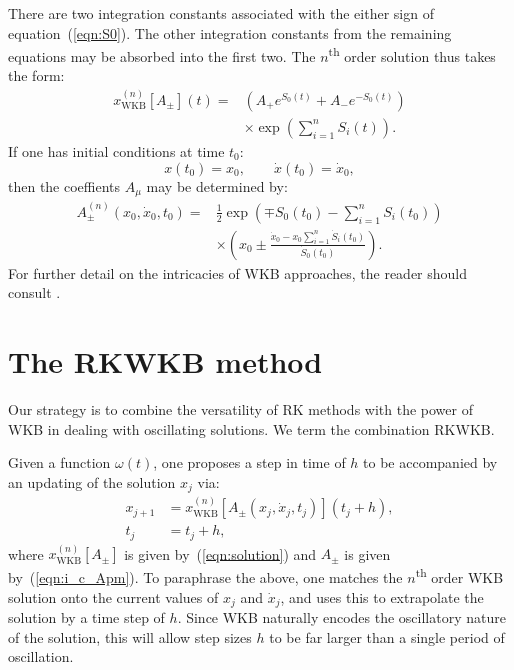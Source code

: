 There are two integration constants associated with the either sign of equation~(\ref{eqn:S0}). The other integration constants from the remaining equations may be absorbed into the first two. The $n$\textsuperscript{th} order solution thus takes the form:
\begin{align}
  x_\mathrm{WKB}^{(n)}[A_{\pm}](t) =&
  \left( A_{+} e^{S_0(t)} + A_{-} e^{-S_0(t)} \right)
  \nonumber\\
  &\times \exp\left( \sum_{i=1}^n S_i(t) \right).
  \label{eqn:solution}
\end{align}
If one has initial conditions at time $t_0$:
\begin{equation}
  x(t_0) = x_0, \qquad \dot{x}(t_0)=\dot{x}_0,
  \label{eqn:i_c}
\end{equation}
then the coeffients $A_\mu$ may be determined by:
\begin{align}
  A_\pm^{(n)}(x_0,\dot{x}_0,t_0) =& \frac{1}{2}\exp{\left( \mp S_0(t_0) - \sum_{i=1}^n S_i(t_0) \right)}
  \nonumber\\
  &\times\left( x_0 \pm  \frac{\dot{x}_0-x_0\sum_{i=1}^n \dot{S}_i(t_0)}{\dot{S}_0(t_0)}\right).
  \label{eqn:i_c_Apm}
\end{align}
For further detail on the intricacies of WKB approaches, the reader should consult \cite{RHB,Bender+2010}.

\section{The RKWKB method}
Our strategy is to combine the versatility of RK methods with the power of WKB in dealing with oscillating solutions. We term the combination RKWKB.

Given a function $\omega(t)$, one proposes a step in time of $h$ to be accompanied by an updating of the solution $x_j$ via:
\begin{align}
  x_{j+1} &= x_\mathrm{WKB}^{(n)}[A_\pm(x_j,\dot{x}_j,t_j)](t_j+h),
  \label{eqn:WKB_x_step} \\
  t_j &= t_j+h,
  \label{eqn:WKB_t_step}
\end{align}
where $x_\mathrm{WKB}^{(n)}[A_{\pm}]$ is given by~(\ref{eqn:solution}) and $A_{\pm}$ is given by~(\ref{eqn:i_c_Apm}).
To paraphrase the above, one matches the $n$\textsuperscript{th} order WKB solution onto the current values of $x_j$ and $\dot{x}_j$, and uses this to extrapolate the solution by a time step of $h$. Since WKB naturally encodes the oscillatory nature of the solution, this will allow step sizes $h$ to be far larger than a single period of oscillation. 

